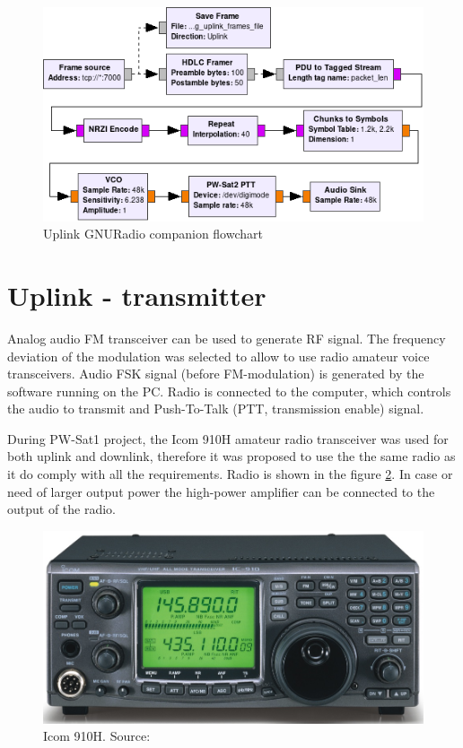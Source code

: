 \begin{figure}
    \centering
    \includegraphics[width=0.8\paperwidth]{img/7/uplink_flowgraph.png}
    \caption{Uplink GNURadio companion flowchart}
    \label{uplink_flowgraph}
\end{figure}


\section{Uplink - transmitter}
Analog audio FM transceiver can be used to generate RF signal. The frequency deviation of the modulation was selected to allow to use radio amateur voice transceivers. Audio FSK signal (before FM-modulation) is generated by the software running on the PC. Radio is connected to the computer, which controls the audio to transmit and Push-To-Talk (PTT, transmission enable) signal.

During PW-Sat1 project, the Icom 910H amateur radio transceiver was used for both uplink and downlink, therefore it was proposed to use the the same radio as it do comply with all the requirements. Radio is shown in the figure \ref{Icom_910H_ref}. In case or need of larger output power the high-power amplifier can be connected to the output of the radio.

\begin{figure}[h]
    \centering
    \includegraphics[width=0.6\paperwidth]{img/7/icom910h.jpg}
    \caption{Icom 910H. Source: \cite{ICOM_910H_pic}}
    \label{Icom_910H_ref}
\end{figure}

